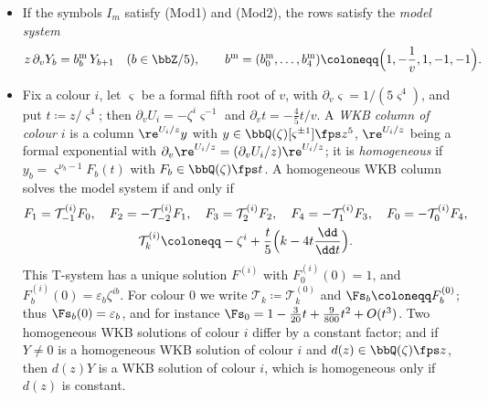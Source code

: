 \begin{prop}
\label{prop:set-modrows}
\begin{itemize}
\item[(a)] If the symbols $I_m$ satisfy (Mod1) and (Mod2), the rows satisfy the \emph{model system}
\[
z\,\partial_vY_b=b^{\mathrm m}_b\,Y_{b+1}\quad(b\in\bbZ/5),\qquad b^{\mathrm m}=(b^{\mathrm m}_0,\dots,b^{\mathrm m}_4)\coloneqq\Bigl(1,-\frac1v,1,-1,-1\Bigr).
\]
\item[(b)] Fix a colour $i$, let $\varsigma$ be a formal fifth root of $v$, with $\partial_v\varsigma=1/(5\varsigma^4)$, and put $t\coloneqq z/\varsigma^4$; then $\partial_vU_i=-\zeta^i\varsigma^{-1}$ and $\partial_vt=-\frac45t/v$. A \emph{WKB column of colour $i$} is a column $\re^{U_i/z}y$ with $y\in\bbQ(\zeta)[\varsigma^{\pm1}]\fps z^5$, $\re^{U_i/z}$ being a formal exponential with $\partial_v\re^{U_i/z}=(\partial_vU_i/z)\re^{U_i/z}$; it is \emph{homogeneous} if $y_b=\varsigma^{\nu_b-1}F_b(t)$ with $F_b\in\bbQ(\zeta)\fps t$. A homogeneous WKB column solves the model system if and only if
\begin{gather*}
F_1=\mathcal T^{(i)}_{-1}F_0,\quad F_2=-\mathcal T^{(i)}_{-2}F_1,\quad F_3=\mathcal T^{(i)}_2F_2,\quad F_4=-\mathcal T^{(i)}_1F_3,\quad F_0=-\mathcal T^{(i)}_0F_4,\\
\mathcal T^{(i)}_k\coloneqq-\zeta^i+\frac t5\Bigl(k-4t\frac{\dd}{\dd t}\Bigr).
\end{gather*}
This T-system has a unique solution $F^{(i)}$ with $F^{(i)}_0(0)=1$, and $F^{(i)}_b(0)=\varepsilon_b\zeta^{ib}$. For colour $0$ we write $\mathcal T_k\coloneqq\mathcal T^{(0)}_k$ and $\Fs_b\coloneqq F^{(0)}_b$; thus $\Fs_b(0)=\varepsilon_b$, and for instance $\Fs_0=1-\frac3{20}t+\frac9{800}t^2+O(t^3)$. Two homogeneous WKB solutions of colour $i$ differ by a constant factor; and if $Y\neq0$ is a homogeneous WKB solution of colour $i$ and $d(z)\in\bbQ(\zeta)\fps z$, then $d(z)Y$ is a WKB solution of colour $i$, which is homogeneous only if $d(z)$ is constant.
\end{itemize}
\end{prop}

